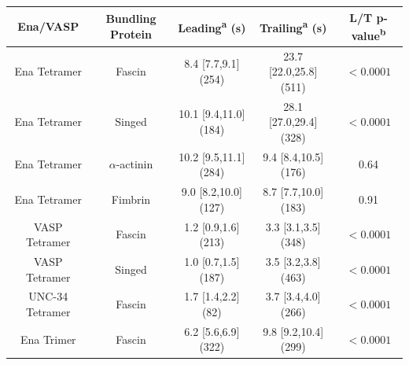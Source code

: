 \begin{table}[hbtp]
\centering 
\begin{tabulary}{0.7\textwidth}{C C C C C}
\toprule Ena/VASP & Bundling Protein & Leading\textsuperscript{a} (s) & Trailing\textsuperscript{a} (s) & L/T p-value\textsuperscript{b} \\ 
\midrule 
Ena Tetramer & Fascin & 8.4\hspace{0.5cm} [7.7,9.1] (254) & 23.7\hspace{0.3cm} [22.0,25.8]\hspace{0.3cm} (511) & ${<0.0001}$ \\ 
Ena Tetramer & Singed & 10.1 [9.4,11.0] (184) & 28.1\hspace{0.3cm} [27.0,29.4]\hspace{0.3cm} (328) & ${<0.0001}$ \\ 
Ena Tetramer & $\alpha$-actinin & 10.2 [9.5,11.1] (284) & 9.4\hspace{0.7cm} [8.4,10.5]\hspace{0.3cm} (176) & 0.64 \\
Ena Tetramer & Fimbrin & 9.0\hspace{0.3cm} [8.2,10.0] (127) & 8.7\hspace{0.8cm} [7.7,10.0]\hspace{0.3cm} (183) & 0.91 \\
VASP Tetramer & Fascin & 1.2\hspace{0.5cm} [0.9,1.6] (213) & 3.3\hspace{0.9cm} [3.1,3.5]\hspace{0.5cm} (348) & ${<0.0001}$ \\
VASP Tetramer & Singed & 1.0\hspace{0.5cm} [0.7,1.5] (187) & 3.5\hspace{0.9cm} [3.2,3.8]\hspace{0.5cm} (463) & ${<0.0001}$ \\
UNC-34 Tetramer & Fascin & 1.7\hspace{0.4cm} [1.4,2.2]\hspace{0.3cm} (82) & 3.7\hspace{0.9cm} [3.4,4.0]\hspace{0.3cm} (266) & ${<0.0001}$ \\
Ena\hspace{0.2cm} Trimer & Fascin & 6.2\hspace{0.5cm} [5.6,6.9] (322) & 9.8\hspace{0.8cm} [9.2,10.4]\hspace{0.3cm} (299) & ${<0.0001}$ \\

\end{tabulary}
\end{table}
